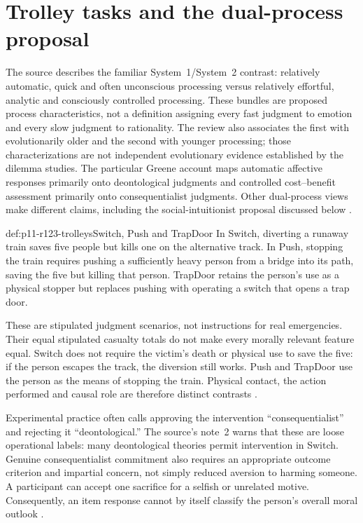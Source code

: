 \section{Trolley tasks and the dual-process proposal}
\label{sec:p11-r123-dual}

The source describes the familiar System~1/System~2 contrast: relatively
automatic, quick and often unconscious processing versus relatively
effortful, analytic and consciously controlled processing. These bundles
are proposed process characteristics, not a definition assigning every
fast judgment to emotion and every slow judgment to rationality. The
review also associates the first with evolutionarily older and the second
with younger processing; those characterizations are not independent
evolutionary evidence established by the dilemma studies.
The
particular Greene account maps automatic affective responses primarily
onto deontological judgments and controlled cost--benefit assessment
primarily onto consequentialist judgments. Other dual-process views make
different claims, including the social-intuitionist proposal discussed below
\parencite[p.~702]{WiegmannSauer2021MoralJudgment}.

\begin{hbexample}{def:p11-r123-trolleys}{Switch, Push and TrapDoor}
In Switch, diverting a runaway train saves five people but kills one on
the alternative track. In Push, stopping the train requires pushing a
sufficiently heavy person from a bridge into its path, saving the five but killing that
person. TrapDoor retains the person's use as a physical stopper but
replaces pushing with operating a switch that opens a trap door.

These are stipulated judgment scenarios, not instructions for real
emergencies. Their equal stipulated casualty totals do not make every
morally relevant feature equal. Switch does not require the victim's
death or physical use to save the five: if the person escapes the track,
the diversion still works. Push and TrapDoor use the person as the means
of stopping the train. Physical contact, the action performed and causal
role are therefore distinct contrasts
\parencite[pp.~702--704]{WiegmannSauer2021MoralJudgment}.
\end{hbexample}

Experimental practice often calls approving the intervention
``consequentialist'' and rejecting it ``deontological.'' The source's
note~2 warns that these are loose operational labels: many deontological
theories permit intervention in Switch. Genuine consequentialist commitment
also requires an appropriate outcome criterion and impartial concern,
not simply reduced aversion to harming someone. A participant can accept
one sacrifice for a selfish or unrelated motive. Consequently, an item
response cannot by itself classify the person's overall moral outlook
\parencite[p.~702 and note~2]{WiegmannSauer2021MoralJudgment}.

